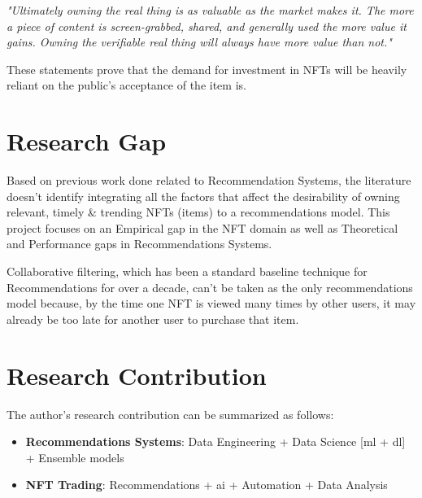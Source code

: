 \documentclass[a4paper, 12pt, oneside]{report}
\begin{document}
\emph{"Ultimately owning the real thing is as valuable as the market makes it. The more a piece of content is screen-grabbed, shared, and generally used the more value it gains. Owning the verifiable real thing will always have more value than not."} \autocite{noauthor_erc-721_nodate}

These statements prove that the demand for investment in NFTs will be heavily reliant on the public's acceptance of the item is.



\chapter{Research Gap}
Based on previous work done related to Recommendation Systems, the literature doesn't identify integrating all the factors that affect the desirability of owning relevant, timely \& trending NFTs (items) to a recommendations model. This project focuses on an Empirical gap in the NFT domain as well as Theoretical and Performance gaps in Recommendations Systems. 

Collaborative filtering, which has been a standard baseline technique for Recommendations for over a decade, can't be taken as the only recommendations model because, by the time one NFT is viewed many times by other users, it may already be too late for another user to purchase that item.


\chapter{Research Contribution}


The author's research contribution can be summarized as follows:
\begin{itemize}
\item \textbf{Recommendations Systems}: Data Engineering + Data Science [\Gls{ml} + \Gls{dl}] + Ensemble models
\item \textbf{NFT Trading}: Recommendations + \Gls{ai} + Automation + Data Analysis
\end{itemize}
\end{document}
